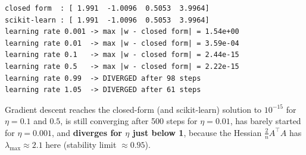 \documentclass[10pt,a4paper,openany,oneside]{report}
\begin{document}
\begin{lstlisting}[style=out,basicstyle=\ttfamily\fontsize{7.2}{8.6}\selectfont,title={Captured output}]
closed form  : [ 1.991  -1.0096  0.5053  3.9964]
scikit-learn : [ 1.991  -1.0096  0.5053  3.9964]
learning rate 0.001 -> max |w - closed form| = 1.54e+00
learning rate 0.01  -> max |w - closed form| = 3.59e-04
learning rate 0.1   -> max |w - closed form| = 2.44e-15
learning rate 0.5   -> max |w - closed form| = 2.22e-15
learning rate 0.99  -> DIVERGED after 98 steps
learning rate 1.05  -> DIVERGED after 61 steps
\end{lstlisting}
Gradient descent reaches the closed-form (and scikit-learn) solution to $10^{-15}$ for $\eta=0.1$ and $0.5$, is still converging after 500 steps for $\eta=0.01$, has barely started for $\eta=0.001$, and \textbf{diverges for $\eta$ just below 1}, because the Hessian $\frac2n A^\top A$ has $\lambda_{\max}\approx2.1$ here (stability limit $\approx0.95$).
\end{document}
